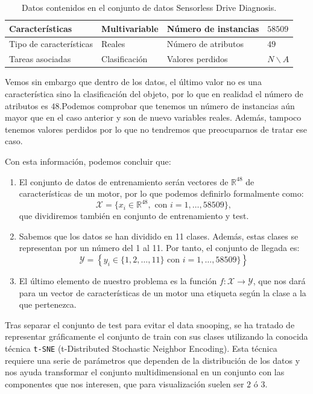 \documentclass[a4paper, 20pt]{article}
\newcommand{\R}{\mathbb R}
\begin{document}
\begin{table}[h]
  \centering
  \begin{tabular}{|l|l|l|l|}
    \hline
    Características         & Multivariable & Número de instancias & $58509$ \\ \hline
    Tipo de características & Reales        & Número de atributos  & $49$    \\ \hline
    Tareas asociadas        & Clasificación     & Valores perdidos     & $N\backslash A$   \\ \hline
  \end{tabular}
  \caption{Datos contenidos en el conjunto de datos Sensorless Drive Diagnosis.}
\end{table}

Vemos sin embargo que dentro de los datos, el último valor no es una característica sino la clasificación del objeto, por lo que en realidad el número de atributos es $48$.Podemos comprobar que tenemos un número de instancias aún mayor que en el caso anterior y son de nuevo variables reales. Además, tampoco tenemos valores perdidos por lo que no tendremos que preocuparnos de tratar ese caso. 

Con esta información, podemos concluir que:

\begin{enumerate}
\item El conjunto de datos de entrenamiento serán vectores de $\R^{48}$ de características de un motor, por lo que podemos definirlo formalmente como:
$$
\mathcal X = \{ x_i \in \R^{48}, \text{ con } i= 1, \dots, 58509\},
$$
que dividiremos también en conjunto de entrenamiento y test.

\item Sabemos que los datos se han dividido en 11 clases. Además, estas clases se representan por un número del 1 al 11. Por tanto, el conjunto de llegada es:
$$
\mathcal Y = \left\{ y_i \in \{1,2,\dots,11\} \text{ con } i = 1,\dots, 58509\}\right\}
$$
\item El último elemento de nuestro problema es la función $f: \mathcal X \to \mathcal Y$, que nos dará para un vector de características de un motor una etiqueta según la clase a la que pertenezca.
\end{enumerate}


Tras separar el conjunto de test para evitar el data snooping, se ha tratado de representar gráficamente el conjunto de train con sus clases utilizando la conocida técnica \lstinline{t-SNE} (t-Distributed Stochastic Neighbor Encoding). Esta técnica requiere una serie de parámetros que dependen de la distribución de los datos y nos ayuda transformar el conjunto multidimensional en un conjunto con las componentes que nos interesen, que para visualización suelen ser $2$ ó $3$. 
\end{document}

